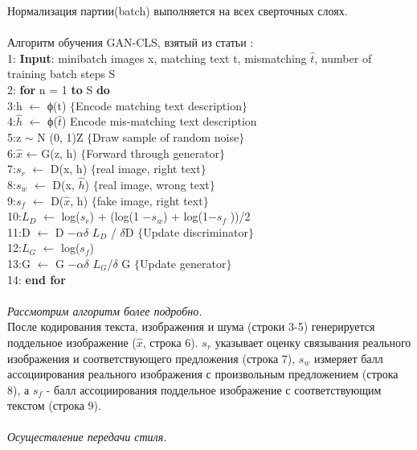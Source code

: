 \documentclass{article}
\begin{document}
    Нормализация партии(batch) выполняется на всех сверточных слоях.
    \\ \\
    Алгоритм обучения GAN-CLS, взятый из статьи :
    \\
    1:   \textbf{Input}: minibatch images x, matching text t, mismatching $\hat{t}$, number of training batch steps S\\
    2:   \textbf{for} n = 1 \textbf{to} S \textbf{do}\\
    3:\indent   h $\leftarrow$ ϕ(t) $\{$Encode matching text description$\}$\\
    4:\indent   $\hat{h}$ $\leftarrow$ ϕ($\hat{t}$) {Encode mis-matching text description}\\
    5:\indent   z $\sim$ N (0, 1)Z $\{$Draw sample of random noise$\}$\\
    6:\indent   $\hat{x}$ ← G(z, h) $\{$Forward through generator$\}$\\
    7:\indent   $s_{r}$ $\leftarrow$ D(x, h) $\{$real image, right text$\}$\\
    8:\indent   $s_{w}$ $\leftarrow$ D(x, $\hat{h}$) $\{$real image, wrong text$\}$\\
    9:\indent   $s_{f}$ $\leftarrow$ D($\hat{x}$, h) $\{$fake image, right text$\}$\\
    10:\indent $L_{D}$ $\leftarrow$ log($s_{r}$) + (log(1 $- s_{w}$) + log(1$ - s_{f}$ ))/2\\
    11:\indent D $\leftarrow$ D $- \alpha \delta$ $L_{D}$ / $\delta$D $\{$Update discriminator$\}$\\
    12:\indent $L_{G}$ $\leftarrow$ log($s_{f}$)\\
    13:\indent G $\leftarrow$ G $- \alpha \delta$ $L_{G}$/$\delta$ G $\{$Update generator$\}$\\
    14:  \textbf {end for}\\
    \\
    \textit{Рассмотрим алгоритм более подробно.} \\
    После кодирования текста, изображения и шума (строки 3-5) генерируется поддельное изображение ($\hat{x}$, строка 6). $s_{r}$ указывает оценку связывания реального изображения и соответствующего предложения (строка 7), $s_{w}$ измеряет балл ассоциирования реального изображения с произвольным предложением (строка 8), а $s_{f}$ - балл ассоциирования поддельное изображение с соответствующим текстом (строка 9).
    \\ \\
    \textit{Осуществление передачи стиля.}\\
\end{document}
